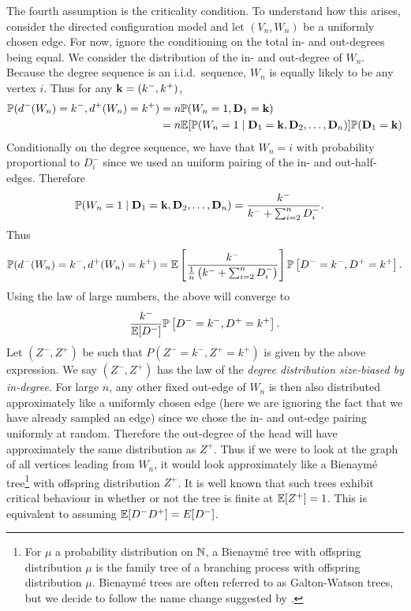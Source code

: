 The fourth assumption is the criticality condition. To understand how this arises, consider the directed configuration model and let $(V_n, W_n)$ be a uniformly chosen edge. For now, ignore the conditioning on the total in- and out-degrees being equal. We consider the distribution of the in- and out-degree of $W_n$. Because the degree sequence is an i.i.d.\ sequence, $W_n$ is equally likely to be any vertex $i$. Thus for any ${\mathbf k} = (k^-, k^+)$,
\begin{align*}
    {\mathbb P}(d^-(W_n) = k^-, d^+(W_n) = k^+)
    &= n {\mathbb P}(W_n = 1, {\mathbf D}_1 = {\mathbf k}) \\
    &= n {\mathbb E}[{\mathbb P}(W_n = 1 \mid {\mathbf D}_1 = {\mathbf k}, {\mathbf D}_2, \ldots, {\mathbf D}_n)] {\mathbb P}({\mathbf D}_1 = {\mathbf k})
\end{align*}
Conditionally on the degree sequence, we have that $W_n = i$ with probability proportional to $D^-_i$ since we used an uniform pairing of the in- and out-half-edges. Therefore
\begin{align*}
    {\mathbb P}(W_n = 1 \mid {\mathbf D}_1 = {\mathbf k}, {\mathbf D}_2, \ldots, {\mathbf D}_n)
    &= \frac{k^-}{k^- + \sum_{i=2}^n D_i^-}.
\end{align*}
Thus
\begin{equation*}
    {\mathbb P}(d^-(W_n) = k^-, d^+(W_n) = k^+) = {\mathbb E}\left[ 
        \frac{k^-}{\frac{1}{n}\left( k^- + \sum_{i=2}^n D_i^- \right)}
    \right]
    {\mathbb P} \left[ D^- = k^-, D^+ = k^+ \right].
\end{equation*}
Using the law of large numbers, the above will converge to
\begin{equation*}
    \frac{k^-}{{\mathbb E}[D^-]} {\mathbb P}\left[ D^- = k^-, D^+ = k^+ \right].
\end{equation*}
Let $(Z^-, Z^+)$ be such that $P(Z^- = k^-, Z^+ = k^+)$ is given by the above expression. We say $(Z^-, Z^+)$ has the law of the \emph{degree distribution size-biased by in-degree}. For large $n$, any other fixed out-edge of $W_n$ is then also distributed approximately like a uniformly chosen edge (here we are ignoring the fact that we have already sampled an edge) since we chose the in- and out-edge pairing uniformly at random. Therefore the out-degree of the head will have approximately the same distribution as $Z^+$. Thus if we were to look at the graph of all vertices leading from $W_n$, it would look approximately like a Bienaymé tree\footnote{For $\mu$ a probability distribution on ${\mathbb N}$, a Bienaymé tree with offspring distribution $\mu$ is the family tree of a branching process with offspring distribution $\mu$. Bienaymé trees are often referred to as Galton-Watson trees, but we decide to follow the name change suggested by \citet{addarioberry2021universal}.} with offspring distribution $Z^+$. It is well known that such trees exhibit critical behaviour in whether or not the tree is finite at ${\mathbb E}[Z^+] = 1$. This is equivalent to assuming ${\mathbb E}[D^-D^+] = E[D^-]$.

